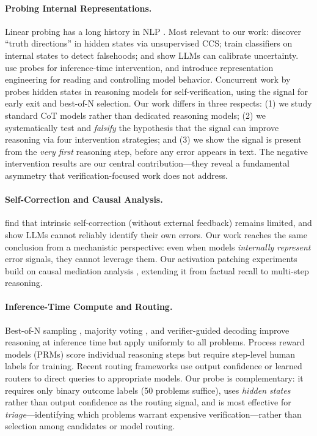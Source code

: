 \documentclass[11pt]{article}
\begin{document}
\paragraph{Probing Internal Representations.}
Linear probing has a long history in NLP \cite{belinkov2022probing,alain2017understanding}.
Most relevant to our work: \citet{burns2023discovering} discover ``truth directions'' in hidden states via unsupervised CCS; \citet{azaria2023internal} train classifiers on internal states to detect falsehoods; and \citet{kadavath2022language} show LLMs can calibrate uncertainty.
\citet{li2024inference} use probes for inference-time intervention, and \citet{zou2023representation} introduce representation engineering for reading and controlling model behavior.
Concurrent work by \citet{zhang2025reasoning} probes hidden states in reasoning models for self-verification, using the signal for early exit and best-of-N selection.
Our work differs in three respects: (1) we study standard CoT models rather than dedicated reasoning models; (2) we systematically test and \textit{falsify} the hypothesis that the signal can improve reasoning via four intervention strategies; and (3) we show the signal is present from the \textit{very first} reasoning step, before any error appears in text.
The negative intervention results are our central contribution---they reveal a fundamental asymmetry that verification-focused work does not address.

\paragraph{Self-Correction and Causal Analysis.}
\citet{huang2024large} find that intrinsic self-correction (without external feedback) remains limited, and \citet{kamoi2024can} show LLMs cannot reliably identify their own errors.
Our work reaches the same conclusion from a mechanistic perspective: even when models \textit{internally represent} error signals, they cannot leverage them.
Our activation patching experiments build on causal mediation analysis \cite{vig2020investigating,meng2022locating,geiger2024finding}, extending it from factual recall to multi-step reasoning.

\paragraph{Inference-Time Compute and Routing.}
Best-of-N sampling \cite{lightman2024lets}, majority voting \cite{wang2023selfconsistency}, and verifier-guided decoding \cite{cobbe2021training} improve reasoning at inference time but apply uniformly to all problems.
Process reward models (PRMs) score individual reasoning steps but require step-level human labels for training.
Recent routing frameworks use output confidence \cite{shen2025sater} or learned routers to direct queries to appropriate models.
Our probe is complementary: it requires only binary outcome labels (50 problems suffice), uses \textit{hidden states} rather than output confidence as the routing signal, and is most effective for \textit{triage}---identifying which problems warrant expensive verification---rather than selection among candidates or model routing.
\end{document}
